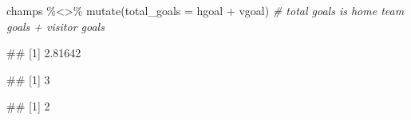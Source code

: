 \documentclass[
]{book}
\newenvironment{Shaded}{\begin{snugshade}}{\end{snugshade}}
\newcommand{\AttributeTok}[1]{\textcolor[rgb]{0.77,0.63,0.00}{#1}}
\newcommand{\CommentTok}[1]{\textcolor[rgb]{0.56,0.35,0.01}{\textit{#1}}}
\newcommand{\FunctionTok}[1]{\textcolor[rgb]{0.00,0.00,0.00}{#1}}
\newcommand{\NormalTok}[1]{#1}
\newcommand{\SpecialCharTok}[1]{\textcolor[rgb]{0.00,0.00,0.00}{#1}}
\begin{document}
\begin{Shaded}
\begin{Highlighting}[]
\NormalTok{champs }\SpecialCharTok{\%\textless{}\textgreater{}\%} \FunctionTok{mutate}\NormalTok{(}\AttributeTok{total\_goals =}\NormalTok{ hgoal }\SpecialCharTok{+}\NormalTok{ vgoal) }\CommentTok{\# total goals is home team goals + visitor goals}
\end{Highlighting}
\end{Shaded}

\begin{Shaded}
\end{Shaded}

\begin{Shaded}
\begin{Highlighting}[]
\NormalTok{\#\# [1] 2.81642}
\end{Highlighting}
\end{Shaded}

\begin{Shaded}
\end{Shaded}

\begin{Shaded}
\begin{Highlighting}[]
\NormalTok{\#\# [1] 3}
\end{Highlighting}
\end{Shaded}

\begin{Shaded}
\end{Shaded}

\begin{Shaded}
\begin{Highlighting}[]
\NormalTok{\#\# [1] 2}
\end{Highlighting}
\end{Shaded}
\end{document}
